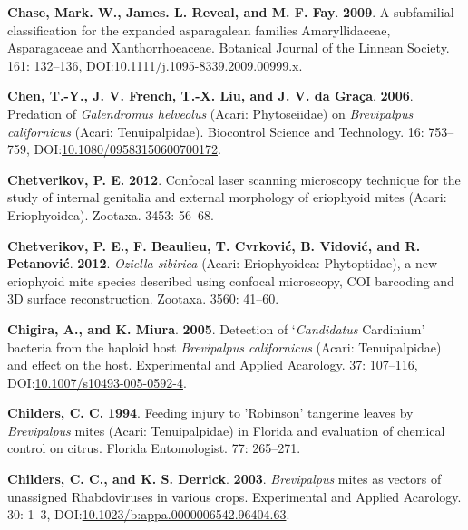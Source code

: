 \documentclass[12pt,final,CPage]{ufthesis}
\newlength{\cslhangindent}
\newenvironment{CSLReferences}[2] %
{%
	\setlength{\parindent}{0pt}
	\ifodd #1 \everypar{\setlength{\hangindent}{\cslhangindent}}\ignorespaces\fi
	\ifnum #2 > 0
	\setlength{\parskip}{#2\baselineskip}
	\fi
}%
{}
\begin{document}
{\begin{CSLReferences}{1}{0}
  \leavevmode{}%
  \textbf{Chase, Mark. W., James. L. Reveal, and M. F. Fay}. \textbf{2009}. A subfamilial classification for the expanded asparagalean families {Amaryllidaceae}, {Asparagaceae} and {Xanthorrhoeaceae}. Botanical Journal of the Linnean Society. 161: 132--136, DOI:\href{https://doi.org/10.1111/j.1095-8339.2009.00999.x}{10.1111/j.1095-8339.2009.00999.x}.

  \leavevmode{}%
  \textbf{Chen, T.-Y., J. V. French, T.-X. Liu, and J. V. da Graça}. \textbf{2006}. Predation of {\emph{Galendromus helveolus}} ({Acari}: {Phytoseiidae}) on {\emph{Brevipalpus californicus}} ({Acari}: {Tenuipalpidae}). Biocontrol Science and Technology. 16: 753--759, DOI:\href{https://doi.org/10.1080/09583150600700172}{10.1080/09583150600700172}.

  \leavevmode{}%
  \textbf{Chetverikov, P. E.} \textbf{2012}. Confocal laser scanning microscopy technique for the study of internal genitalia and external morphology of eriophyoid mites ({Acari}: {Eriophyoidea}). Zootaxa. 3453: 56--68.

  \leavevmode{}%
  \textbf{Chetverikov, P. E., F. Beaulieu, T. Cvrković, B. Vidović, and R. Petanović}. \textbf{2012}. {\emph{Oziella sibirica}} ({Acari}: {Eriophyoidea}: {Phytoptidae}), a new eriophyoid mite species described using confocal microscopy, {COI} barcoding and {3D} surface reconstruction. Zootaxa. 3560: 41--60.

  \leavevmode{}%
  \textbf{Chigira, A., and K. Miura}. \textbf{2005}. Detection of {`{\emph{Candidatus}} {Cardinium}'} bacteria from the haploid host {\emph{Brevipalpus californicus}} ({Acari}: {Tenuipalpidae}) and effect on the host. Experimental and Applied Acarology. 37: 107--116, DOI:\href{https://doi.org/10.1007/s10493-005-0592-4}{10.1007/s10493-005-0592-4}.

  \leavevmode{}%
  \textbf{Childers, C. C.} \textbf{1994}. Feeding injury to {'Robinson'} tangerine leaves by {\emph{Brevipalpus}} mites ({Acari}: {Tenuipalpidae}) in {Florida} and evaluation of chemical control on citrus. Florida Entomologist. 77: 265--271.

  \leavevmode{}%
  \textbf{Childers, C. C., and K. S. Derrick}. \textbf{2003}. {\emph{Brevipalpus}} mites as vectors of unassigned {Rhabdoviruses} in various crops. Experimental and Applied Acarology. 30: 1--3, DOI:\href{https://doi.org/10.1023/b:appa.0000006542.96404.63}{10.1023/b:appa.0000006542.96404.63}.


\end{CSLReferences}}
\end{document}
